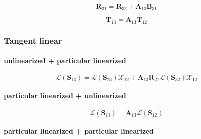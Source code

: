\begin{equation}
\mathbf{R}_{31} = \mathbf{R}_{32} + \mathbf{A}_{13}\mathbf{B}_{31}
\label{eq:adding-downward-forward-R31}
\end{equation}

\begin{equation}
\mathbf{T}_{13} = \mathbf{A}_{13}\mathbf{T}_{12}
\label{eq:adding-downward-forward-T13}
\end{equation}


%
\subsubsection{Tangent linear}
\label{sec:adding-downward-tangent_linear}

\paragraph{unlinearized + particular linearized}
\label{sec:adding-downward-tangent_linear-unlinearized_p_particular_linearized}

\begin{equation}
\mathcal{L}(\mathbf{S}_{13}) = \mathcal{L}(\mathbf{S}_{23})\mathcal{X}_{12} + \mathbf{A}_{13}\mathbf{R}_{21}\mathcal{L}(\mathbf{S}_{32})\mathcal{X}_{12}
\label{eq:adding-downward-tangent_linear-unlinearized_p_particular_linearized-V13}
\end{equation}


\paragraph{particular linearized + unlinearized}
\label{sec:adding-downward-tangent_linear-particular_linearized_p_unlinearized}

\begin{equation}
\mathcal{L}(\mathbf{S}_{13}) = \mathbf{A}_{13}\mathcal{L}(\mathbf{S}_{12})
\label{eq:adding-downward-tangent_linear-particular_linearized_p_unlinearized-V13}
\end{equation}


\paragraph{particular linearized + particular linearized}
\label{sec:adding-downward-tangent_linear-particular_linearized_p_particular_linearized}

